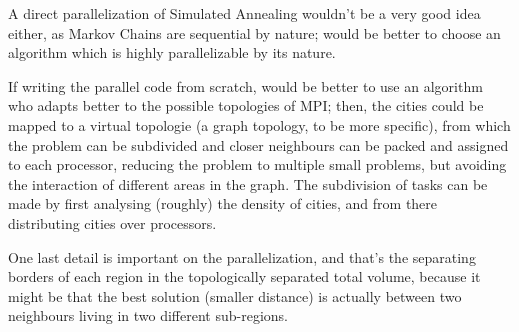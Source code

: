 \documentclass[paper=a4, fontsize=11pt]{scrartcl} %
\numberwithin{equation}{section} %
\numberwithin{figure}{section} %
\numberwithin{table}{section} %
\begin{document}
A direct parallelization of Simulated Annealing wouldn't be a very good idea either, as Markov Chains are sequential by nature; would be better to choose an algorithm which is highly parallelizable by its nature.

If writing the parallel code from scratch, would be better to use an algorithm who adapts better to the possible topologies of MPI; then, the cities could be mapped to a virtual topologie (a graph topology, to be more specific), from which the problem can be subdivided and closer neighbours can be packed and assigned to each processor, reducing the problem to multiple small problems, but avoiding the interaction of different areas in the graph. The subdivision of tasks can be made by first analysing (roughly) the density of cities, and from there distributing cities over processors.

One last detail is important on the parallelization, and that's the separating borders of each region in the topologically separated total volume, because it might be that the best solution (smaller distance) is actually between two neighbours living in two different sub-regions.
\end{document}
